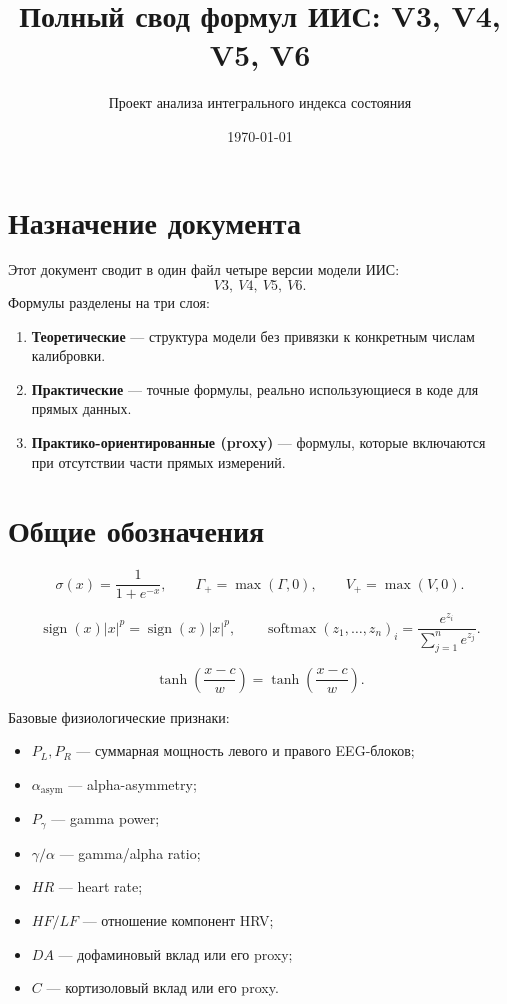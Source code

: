\documentclass[12pt,a4paper]{article}
\title{Полный свод формул ИИС: V3, V4, V5, V6}
\author{Проект анализа интегрального индекса состояния}
\date{\today}
\newcommand{\sgn}{\operatorname{sign}}
\newcommand{\softmax}{\operatorname{softmax}}
\newcommand{\Tnorm}[3]{\tanh\!\left(\frac{#1-#2}{#3}\right)}
\newcommand{\spow}[2]{\sgn(#1)\lvert #1 \rvert^{#2}}
\begin{document}
\maketitle

\section{Назначение документа}
Этот документ сводит в один файл четыре версии модели ИИС:
\[
V3,\ V4,\ V5,\ V6.
\]
Формулы разделены на три слоя:
\begin{enumerate}[leftmargin=1.2cm]
    \item \textbf{Теоретические} --- структура модели без привязки к конкретным числам калибровки.
    \item \textbf{Практические} --- точные формулы, реально использующиеся в коде для прямых данных.
    \item \textbf{Практико-ориентированные (proxy)} --- формулы, которые включаются при отсутствии части прямых измерений.
\end{enumerate}

\section{Общие обозначения}
\[
\sigma(x)=\frac{1}{1+e^{-x}}, \qquad
\Gamma_+=\max(\Gamma,0), \qquad
V_+=\max(V,0).
\]

\[
\spow{x}{p}=\sgn(x)\lvert x \rvert^p,
\qquad
\softmax(z_1,\dots,z_n)_i=\frac{e^{z_i}}{\sum_{j=1}^{n}e^{z_j}}.
\]

\[
\Tnorm{x}{c}{w}=\tanh\!\left(\frac{x-c}{w}\right).
\]

Базовые физиологические признаки:
\begin{itemize}[leftmargin=1.2cm]
    \item \(P_L, P_R\) --- суммарная мощность левого и правого EEG-блоков;
    \item \(\alpha_{\mathrm{asym}}\) --- alpha-asymmetry;
    \item \(P_\gamma\) --- gamma power;
    \item \(\gamma/\alpha\) --- gamma/alpha ratio;
    \item \(HR\) --- heart rate;
    \item \(HF/LF\) --- отношение компонент HRV;
    \item \(DA\) --- дофаминовый вклад или его proxy;
    \item \(C\) --- кортизоловый вклад или его proxy.
\end{itemize}
\end{document}
